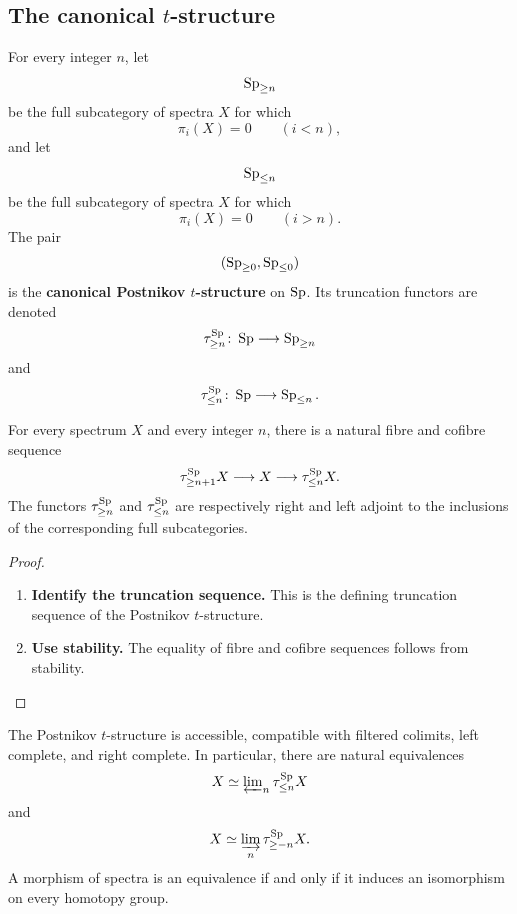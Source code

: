 \subsection{The canonical \texorpdfstring{$t$}{t}-structure}

\begin{definition}
\label{def:postnikov-t-structure}
For every integer $n$, let
\[
    \operatorname{Sp}_{\geq n}
\]
be the full subcategory of spectra $X$ for which
\[
    \pi_i(X)=0
    \qquad
    (i<n),
\]
and let
\[
    \operatorname{Sp}_{\leq n}
\]
be the full subcategory of spectra $X$ for which
\[
    \pi_i(X)=0
    \qquad
    (i>n).
\]
The pair
\[
    (\operatorname{Sp}_{\geq0},\operatorname{Sp}_{\leq0})
\]
is the \textbf{canonical Postnikov $t$-structure} on $\operatorname{Sp}$. Its truncation
functors are denoted
\[
    \tau_{\geq n}^{\operatorname{Sp}}
    \colon
    \operatorname{Sp}
    \longrightarrow
    \operatorname{Sp}_{\geq n}
\]
and
\[
    \tau_{\leq n}^{\operatorname{Sp}}
    \colon
    \operatorname{Sp}
    \longrightarrow
    \operatorname{Sp}_{\leq n}.
\]
\end{definition}

\begin{proposition}
\label{prop:postnikov-truncation-triangle}
For every spectrum $X$ and every integer $n$, there is a natural fibre and
cofibre sequence
\[
    \tau_{\geq n+1}^{\operatorname{Sp}}X
    \longrightarrow
    X
    \longrightarrow
    \tau_{\leq n}^{\operatorname{Sp}}X.
\]
The functors $\tau_{\geq n}^{\operatorname{Sp}}$ and $\tau_{\leq n}^{\operatorname{Sp}}$ are respectively right
and left adjoint to the inclusions of the corresponding full
subcategories.
\end{proposition}

\begin{proof}
\leavevmode
\begin{enumerate}[label=\textup{(\arabic*)}]
    \item \textbf{Identify the truncation sequence.}
    This is the defining truncation sequence of the Postnikov $t$-structure.

    \item \textbf{Use stability.}
    The equality of fibre and cofibre sequences follows from stability.
\end{enumerate}
\end{proof}

\begin{proposition}
\label{prop:postnikov-completeness-detection}
The Postnikov $t$-structure is accessible, compatible with filtered
colimits, left complete, and right complete. In particular, there are
natural equivalences
\[
    X
    \simeq
    \varprojlim\nolimits_n\tau_{\leq n}^{\operatorname{Sp}}X
\]
and
\[
    X
    \simeq
    \varinjlim_n\tau_{\geq -n}^{\operatorname{Sp}}X.
\]
A morphism of spectra is an equivalence if and only if it induces an
isomorphism on every homotopy group.
\end{proposition}

